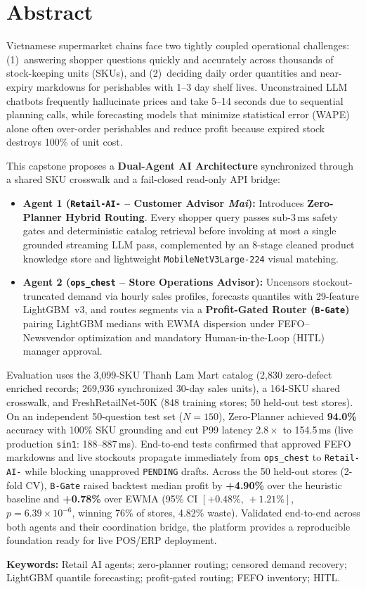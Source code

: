 \chapter*{Abstract}

Vietnamese supermarket chains face two tightly coupled operational challenges: (1)~answering shopper questions quickly and accurately across thousands of stock-keeping units (SKUs), and (2)~deciding daily order quantities and near-expiry markdowns for perishables with 1--3 day shelf lives. Unconstrained LLM chatbots frequently hallucinate prices and take 5--14 seconds due to sequential planning calls, while forecasting models that minimize statistical error (WAPE) alone often over-order perishables and reduce profit because expired stock destroys 100\% of unit cost.

This capstone proposes a \textbf{Dual-Agent AI Architecture} synchronized through a shared SKU crosswalk and a fail-closed read-only API bridge:
\begin{itemize}
    \item \textbf{Agent 1 (\texttt{Retail-AI-} -- Customer Advisor \emph{Mai}):} Introduces \textbf{Zero-Planner Hybrid Routing}. Every shopper query passes sub-3\,ms safety gates and deterministic catalog retrieval before invoking at most a single grounded streaming LLM pass, complemented by an 8-stage cleaned product knowledge store and lightweight \texttt{MobileNetV3Large-224} visual matching.
    \item \textbf{Agent 2 (\texttt{ops\_chest} -- Store Operations Advisor):} Uncensors stockout-truncated demand via hourly sales profiles, forecasts quantiles with 29-feature LightGBM~v3, and routes segments via a \textbf{Profit-Gated Router (\texttt{B-Gate})} pairing LightGBM medians with EWMA dispersion under FEFO--Newsvendor optimization and mandatory Human-in-the-Loop (HITL) manager approval.
\end{itemize}

Evaluation uses the 3,099-SKU Thanh Lam Mart catalog (2,830 zero-defect enriched records; 269,936 synchronized 30-day sales units), a 164-SKU shared crosswalk, and FreshRetailNet-50K (848 training stores; 50 held-out test stores). On an independent 50-question test set ($N=150$), Zero-Planner achieved \textbf{94.0\%} accuracy with 100\% SKU grounding and cut P99 latency $2.8\times$ to 154.5\,ms (live production \texttt{sin1}: 188--887\,ms). End-to-end tests confirmed that approved FEFO markdowns and live stockouts propagate immediately from \texttt{ops\_chest} to \texttt{Retail-AI-} while blocking unapproved \texttt{PENDING} drafts. Across the 50 held-out stores (2-fold CV), \texttt{B-Gate} raised backtest median profit by \textbf{+4.90\%} over the heuristic baseline and \textbf{+0.78\%} over EWMA (95\% CI $[+0.48\%,\,+1.21\%]$, $p = 6.39\times 10^{-6}$, winning 76\% of stores, 4.82\% waste). Validated end-to-end across both agents and their coordination bridge, the platform provides a reproducible foundation ready for live POS/ERP deployment.

\vspace{0.5em}
\noindent\textbf{Keywords:} Retail AI agents; zero-planner routing; censored demand recovery; LightGBM quantile forecasting; profit-gated routing; FEFO inventory; HITL.
